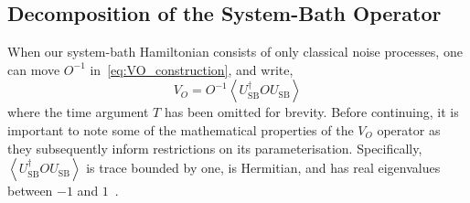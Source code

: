\documentclass[12pt]{iopart}
\begin{document}
\subsection{Decomposition of the System-Bath Operator \label{subsec:decomposition_of_vo}}
When our system-bath Hamiltonian consists of only classical noise processes, one can move $O^{-1}$ in~\cref{eq:VO_construction}, and write,
\begin{equation} \label{eq:VO_construction_1}
    V_O=O^{-1}\left\langle U_{\mathrm{SB}}^{\dagger} O U_{\mathrm{SB}}\right\rangle
\end{equation}
where the time argument $T$ has been omitted for brevity. Before continuing, it is important to note some of the mathematical properties of the $V_O$ operator as they subsequently inform restrictions on its parameterisation. Specifically, $\left\langle U_{\mathrm{SB}}^{\dagger} O U_{\mathrm{SB}}\right\rangle$ is trace bounded by one, is Hermitian, and has real eigenvalues between $-1$ and $1$~\cite{youssry2020characterization}.

\end{document}

